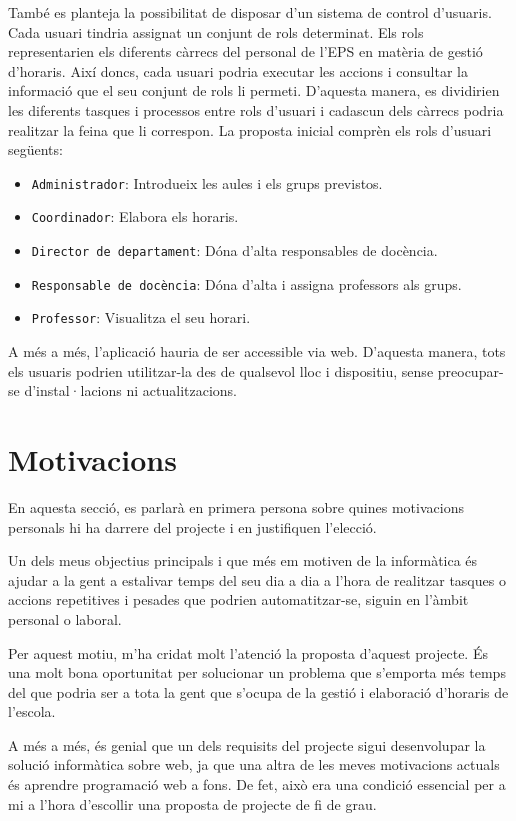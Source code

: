 \documentclass[a4paper,12pt]{ThesisStyle}
\begin{document}
També es planteja la possibilitat de disposar d'un sistema de control d'usuaris. Cada usuari tindria assignat un conjunt de rols determinat. Els rols representarien els diferents càrrecs del personal de l'EPS en matèria de gestió d'horaris. Així doncs, cada usuari podria executar les accions i consultar la informació que el seu conjunt de rols li permeti. D'aquesta manera, es dividirien les diferents tasques i processos entre rols d'usuari i cadascun dels càrrecs podria realitzar la feina que li correspon. La proposta inicial comprèn els rols d'usuari següents:
\begin{itemize}
  \item \texttt{Administrador}: Introdueix les aules i els grups previstos.
  \item \texttt{Coordinador}: Elabora els horaris.
  \item \texttt{Director de departament}: Dóna d'alta responsables de docència.
  \item \texttt{Responsable de docència}: Dóna d'alta i assigna professors als grups.
  \item \texttt{Professor}: Visualitza el seu horari.
\end{itemize}

A més a més, l'aplicació hauria de ser accessible via web. D'aquesta manera, tots els usuaris podrien utilitzar-la des de qualsevol lloc i dispositiu, sense preocupar-se d'instal·lacions ni actualitzacions.

\section{Motivacions}
\label{sec:motivacions}

En aquesta secció, es parlarà en primera persona sobre quines motivacions personals hi ha darrere del projecte i en justifiquen l'elecció.

Un dels meus objectius principals i que més em motiven de la informàtica és ajudar a la gent a estalivar temps del seu dia a dia a l'hora de realitzar tasques o accions repetitives i pesades que podrien automatitzar-se, siguin en l'àmbit personal o laboral.

Per aquest motiu, m'ha cridat molt l'atenció la proposta d'aquest projecte. És una molt bona oportunitat per solucionar un problema que s'emporta més temps del que podria ser a tota la gent que s'ocupa de la gestió i elaboració d'horaris de l'escola.

A més a més, és genial que un dels requisits del projecte sigui desenvolupar la solució informàtica sobre web, ja que una altra de les meves motivacions actuals és aprendre programació web a fons. De fet, això era una condició essencial per a mi a l'hora d'escollir una proposta de projecte de fi de grau.
\end{document}
